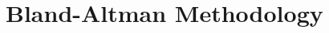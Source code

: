 \documentclass{report}
\begin{document}
\tableofcontents
\newpage
\chapter{Bland-Altman Methodology}




\end{document}
